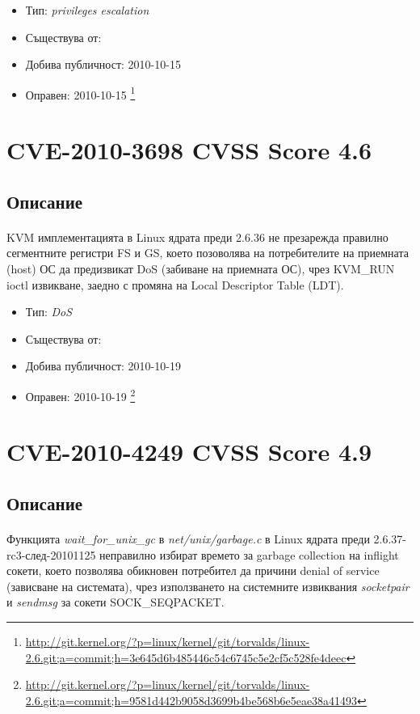 \documentclass[a4paper,12pt,leqno]{article}
\begin{document}
\begin{itemize}
    \item Тип: \textit{privileges escalation}
    \item Съществува от:
  	\item Добива публичност: 2010-10-15
    \item Оправен: 2010-10-15 \footnote{\url{http://git.kernel.org/?p=linux/kernel/git/torvalds/linux-2.6.git;a=commit;h=3e645d6b485446c54c6745c5e2cf5c528fe4deec}}
\end{itemize}



\section{CVE-2010-3698 CVSS Score 4.6}
\subsection{Описание}
\paragraph{}
KVM имплементацията в Linux ядрата преди 2.6.36 не презарежда правилно сегментните регистри FS и GS, което позоволява на потребителите на приемната (host) ОС да предизвикат DoS (забиване на приемната ОС), чрез KVM\_RUN ioctl извикване, заедно с промяна на Local Descriptor Table (LDT).

\begin{itemize}
    \item Тип: \textit{DoS}
    \item Съществува от:
  	\item Добива публичност: 2010-10-19
    \item Оправен: 2010-10-19 \footnote{\url{http://git.kernel.org/?p=linux/kernel/git/torvalds/linux-2.6.git;a=commit;h=9581d442b9058d3699b4be568b6e5eae38a41493}}
\end{itemize}


\section{CVE-2010-4249 CVSS Score 4.9}
\subsection{Описание}
\paragraph{}
Функцията \textit{wait\_for\_unix\_gc} в \textit{net/unix/garbage.c} в Linux ядрата преди 2.6.37-rc3-след-20101125 неправилно избират времето за garbage collection на inflight сокети, което позволява обикновен потребител да причини denial of service (зависване на системата), чрез използването на системните извиквания \textit{socketpair} и \textit{sendmsg} за сокети SOCK\_SEQPACKET.
\end{document}
